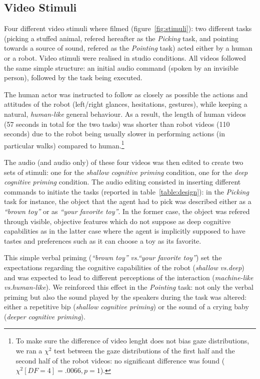 \documentclass[lettersize, noapacite, twoside, HRI]{apa_HRI}
\newcommand{\vs}{\textit{vs.}\xspace}
\begin{document}
\subsection{Video Stimuli}

Four different video stimuli where filmed (figure~\ref{fig:stimuli}): two
different tasks (picking a stuffed animal, refered hereafter as the
\emph{Picking} task, and pointing towards a source of sound, refered as the
\emph{Pointing} task) acted either by a human or a robot. Video stimuli were
realised in studio conditions. All videos followed the same simple structure: an
initial audio command (spoken by an invisible person), followed by the task
being executed.

The human actor was instructed to follow as closely as possible the actions and
attitudes of the robot (left/right glances, hesitations, gestures), while keeping a
natural, \emph{human-like} general behaviour. As a result, the length of human videos
(57 seconds in total for the two tasks) was shorter than robot videos (110
seconds) due to the robot being usually slower in performing actions (in
particular walks) compared to human.\footnote{To make sure the difference of
video lenght does not bias gaze distributions, we ran a $\chi^2$ test between
the gaze distributions of the first half and the second half of the robot
videos: no significant difference was found ($\chi^2[DF=4]=.0066, p=1$).}

The audio (and audio only) of these four videos was then edited to create two
sets of stimuli: one for the \emph{shallow cognitive priming} condition, one for
the \emph{deep cognitive priming} condition. The audio editing consisted in
inserting different commands to initiate the tasks (reported in
table~\ref{table:design}): in the \emph{Picking} task for instance, the object
that the agent had to pick was described either as a \emph{``brown toy''} or as
\emph{``your favorite toy''}. In the former case, the object was refered through
visible, objective features which do not suppose as deep cognitive capabilities
as in the latter case where the agent is implicitly supposed to have
tastes and preferences such as it can choose a toy as its favorite.

This simple verbal priming (\emph{``brown toy''} \vs \emph{``your favorite
toy''}) set the expectations regarding the cognitive capabilities of the robot
(\emph{shallow} \vs \emph{deep}) and was expected to lead to different
perceptions of the interaction (\emph{machine-like} \vs \emph{human-like}). We
reinforced this effect in the \emph{Pointing} task: not only the verbal priming
but also the sound played by the speakers during the task was altered: either a
repetitive bip (\emph{shallow cognitive priming}) or the sound of a crying baby
(\emph{deeper cognitive priming}).
\end{document}
